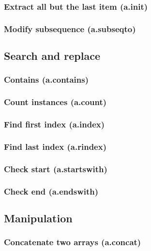 \documentclass{article}
\theoremstyle{definition}
\begin{document}
\subsubsection{Extract all but the last item (a.init)}

\subsubsection{Modify subsequence (a.subseqto)}

\subsection{Search and replace}

\subsubsection{Contains (a.contains)}

\subsubsection{Count instances (a.count)}

\subsubsection{Find first index (a.index)}

\subsubsection{Find last index (a.rindex)}

\subsubsection{Check start (a.startswith)}

\subsubsection{Check end (a.endswith)}

\subsection{Manipulation}

\subsubsection{Concatenate two arrays (a.concat)}
\end{document}
